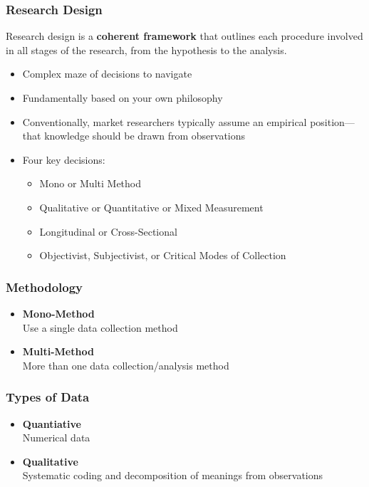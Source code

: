 \begin{frame}
	\frametitle{Research Design}
	
	Research design is a \textbf{coherent framework} that outlines each procedure involved in all stages of the research, from the hypothesis to the analysis.

	\begin{itemize}
		\item Complex maze of decisions to navigate
		\item Fundamentally based on your own philosophy
		\item Conventionally, market researchers typically assume an empirical position---that knowledge should be drawn from observations
		\item Four key decisions:
		\begin{itemize}
			\item Mono or Multi Method
			\item Qualitative or Quantitative or Mixed Measurement
			\item Longitudinal or Cross-Sectional
			\item Objectivist, Subjectivist, or Critical Modes of Collection
		\end{itemize}
	\end{itemize}
\end{frame}

\begin{frame}
	\frametitle{Methodology}
	\begin{itemize}
		\item \textbf{Mono-Method} \\
		Use a single data collection method
		\item \textbf{Multi-Method} \\
		More than one data collection/analysis method
	\end{itemize}
\end{frame}

\begin{frame}
	\frametitle{Types of Data}
	\begin{itemize}
		\item \textbf{Quantiative} \\
		Numerical data
		\item \textbf{Qualitative} \\
		Systematic coding and decomposition of meanings from observations
	\end{itemize}
\end{frame}

